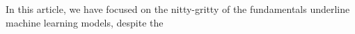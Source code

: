 In this article, we have focused on the nitty-gritty of the fundamentals underline machine learning models, despite the 
